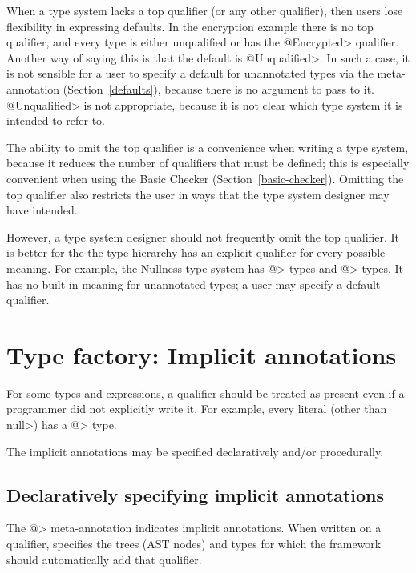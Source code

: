 When a type system lacks a top qualifier (or any other qualifier), then
users lose flexibility in expressing defaults.  In the encryption example
there is no top qualifier, and every type is either unqualified or has the
\<@Encrypted> qualifier.  Another way of saying this is that the default is
\<@Unqualified>.  In such a case, it is not sensible for a user to specify
a default for unannotated types via the
 meta-annotation
(Section~\ref{defaults}), because there is no argument to pass to it.
\<@Unqualified> is not appropriate, because it is not clear which type
system it is intended to refer to.

The ability to omit the top qualifier is a convenience
when writing a type system, because it reduces the number of qualifiers
that must be defined; this is especially convenient when using the Basic
Checker (Section~\ref{basic-checker}).
Omitting the top qualifier also restricts the user in ways that the type
system designer may have intended.

However, a type system designer should not frequently omit the top qualifier.
It is better for the 
the type hierarchy has an explicit qualifier for every
possible meaning.  For example, the Nullness type system has
\<@> types and
\<@> types.  It has no built-in meaning for
unannotated types; a user may specify a default qualifier.


\section{Type factory: Implicit annotations\label{writing-type-introduction}}

For some types and expressions, a qualifier should be treated as present
even if a programmer did not explicitly write it.  For example, every
literal (other than \<null>) has a \<@> type.

The implicit annotations may be specified declaratively and/or procedurally.


\subsection{Declaratively specifying implicit annotations\label{declarative-type-introduction}}

The \<@> meta-annotation indicates implicit annotations.
When written on a qualifier, 
specifies the trees (AST nodes) and types for which the framework should
automatically add that qualifier.

